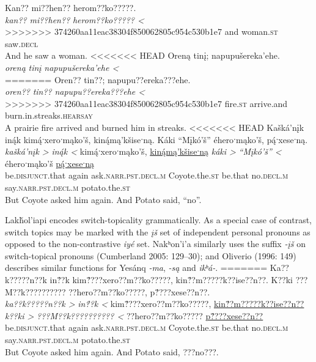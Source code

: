 \documentclass[output=paper]{LSP/langsci}
\begin{document}
\ea\label{ruetaswitchtopic}
\ea\label{ruetanewtopic}
Kan?? mi??hen?? herom??ko?????.\footnotemark\\
\gll 	\emph{kan??}	 	\emph{mi??hen??} 	\emph{herom??ko????? <}\\
>>>>>>> 374260aa11eac38304f850062805c954c530b1e7
	and 			woman.\textsc{st} 	saw.\textsc{decl}\\
\glt	And he saw a woman.
\ex\label{ruetaatypicalsubject}
<<<<<<< HEAD
Oreną tinį; napupušereka’ehe.\footnotemark\\
\gll 	\emph{oreną}	\emph{tinį}	\emph{napupušereka’ehe <}\\
=======
Oren?? tin??; napupu??ereka???ehe.\footnotemark\\
\gll 	\emph{oren??}	\emph{tin??}	\emph{napupu??ereka???ehe <}\\
>>>>>>> 374260aa11eac38304f850062805c954c530b1e7
	fire.\textsc{st} 	arrive.and 	burn.in.streaks.\textsc{hearsay}\\
\glt	A prairie fire arrived and burned him in streaks.
\ex\label{birdcompetition}
<<<<<<< HEAD
Kašká’nįk in\'{ą}k kim\'{ą}ˑxeroˑmąko’š, kin\'{ą}mą’kšiseˑną. Káki “Mįkó’š” éheroˑmąko’š, p\'{ą}ˑxeseˑną.\footnotemark\\
\gll 	\emph{kašká’nįk >}		\emph{in\'{ą}k <} 	kim\'{ą}ˑxeroˑmąko’š, 		\underline{kin\'{ą}mą’kšiseˑną}	\emph{káki >}	\emph{“Mįkó’š” <}			éheroˑmąko’š 			\underline{p\'{ą}ˑxeseˑną}\\
	be.\textsc{disjunct}.that 	again 			ask.\textsc{narr.pst.decl.m} 	Coyote.the.\textsc{st}		be.that 		no.\textsc{decl.m} 					say.\textsc{narr.pst.decl.m} 	potato.the.\textsc{st}\\
\glt	But Coyote asked him again. And Potato said, “no”.
\z\z

	Lakȟol’iapi encodes switch-topicality grammatically. As a special case of contrast, switch topics may be marked with the \emph{įš} set of independent personal pronouns as opposed to the non-contrastive \emph{iyé} set. Nakʰon’i’a similarly uses the suffix \emph{-įš} on switch-topical pronouns (Cumberland 2005: 129--30); and Oliverio (1996: 149) describes similar functions for Yesánq \emph{-ma}, \emph{-są} and \emph{ikʰá-}. 
=======
Ka??k?????n??k in\'{??}k kim\'{??}??xero??m??ko?????, kin\'{??}m?????k??ise??n??. K??ki ???M??k?????????? ??hero??m??ko?????, p\'{??}??xese??n??.\footnotemark\\
\gll 	\emph{ka??k?????n??k >}		\emph{in\'{??}k <} 	kim\'{??}??xero??m??ko?????, 		\underline{kin\'{??}m?????k??ise??n??}	\emph{k??ki >}	\emph{???M??k?????????? <}			??hero??m??ko????? 			\underline{p\'{??}??xese??n??}\\
	be.\textsc{disjunct}.that 	again 			ask.\textsc{narr.pst.decl.m} 	Coyote.the.\textsc{st}		be.that 		no.\textsc{decl.m} 					say.\textsc{narr.pst.decl.m} 	potato.the.\textsc{st}\\
\glt	But Coyote asked him again. And Potato said, ???no???.
\z\z
\end{document}
